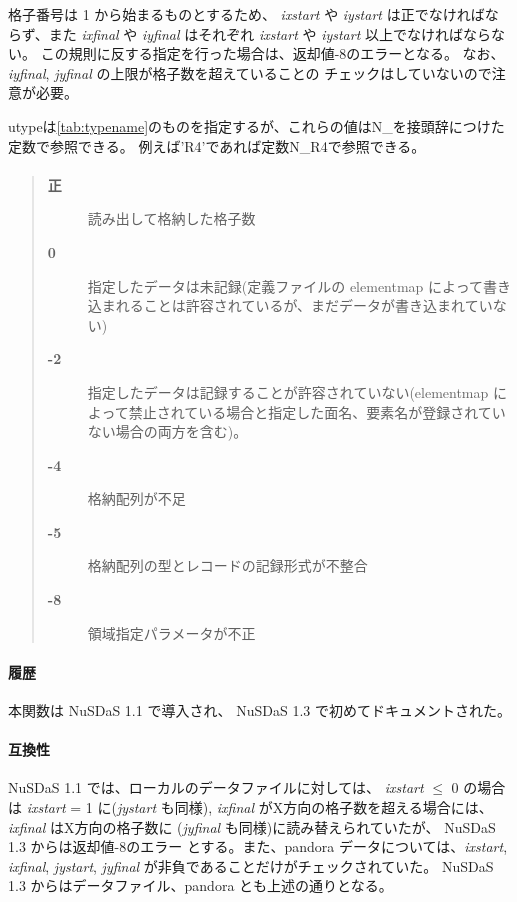 格子番号は 1 から始まるものとするため、
{\it ixstart} や {\it iystart} は正でなければならず、また
{\it ixfinal} や {\it iyfinal} はそれぞれ
{\it ixstart} や {\it iystart} 以上でなければならない。
この規則に反する指定を行った場合は、返却値-8のエラーとなる。
なお、{\it iyfinal}, {\it jyfinal} の上限が格子数を超えていることの
チェックはしていないので注意が必要。

utypeは\ref{tab:typename}のものを指定するが、これらの値はN\_を接頭辞につけた定数で参照できる。
例えば'R4'であれば定数N\_R4で参照できる。

\paragraph{\ResultCode}
\begin{quote}
\begin{description}
\item[{\bf 正}] 読み出して格納した格子数
\item[{\bf 0}] 指定したデータは未記録(定義ファイルの elementmap によって書き込まれることは許容されているが、まだデータが書き込まれていない)
\item[{\bf -2}] 指定したデータは記録することが許容されていない(elementmap によって禁止されている場合と指定した面名、要素名が登録されていない場合の両方を含む)。
\item[{\bf -4}] 格納配列が不足
\item[{\bf -5}] 格納配列の型とレコードの記録形式が不整合
\item[{\bf -8}] 領域指定パラメータが不正
\end{description}\end{quote}

\paragraph{履歴}
本関数は NuSDaS 1.1 で導入され、 NuSDaS 1.3 で初めてドキュメントされた。
\paragraph{互換性}
NuSDaS 1.1 では、ローカルのデータファイルに対しては、
{\it ixstart} $\le$ 0 の場合は {\it ixstart} = 1 に({\it jystart} も同様), 
{\it ixfinal} がX方向の格子数を超える場合には、{\it ixfinal} はX方向の格子数に
({\it jyfinal} も同様)に読み替えられていたが、 NuSDaS 1.3 からは返却値-8のエラー
とする。また、pandora データについては、{\it ixstart}, {\it ixfinal}, 
{\it jystart}, {\it jyfinal} が非負であることだけがチェックされていた。
NuSDaS 1.3 からはデータファイル、pandora とも上述の通りとなる。
